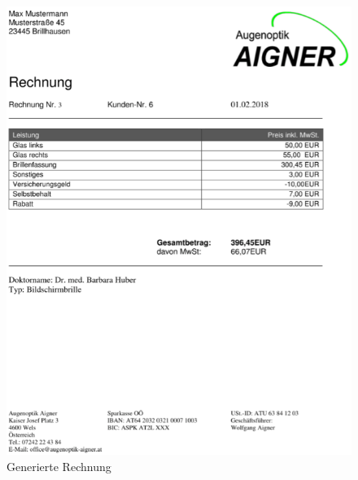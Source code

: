 \begin{figure}
\begin{center}
	\includegraphics[scale=0.9]{images/Musterrechnung.png}
\end{center}
	\caption{Generierte Rechnung}
	\label{fig:sample}
\end{figure}